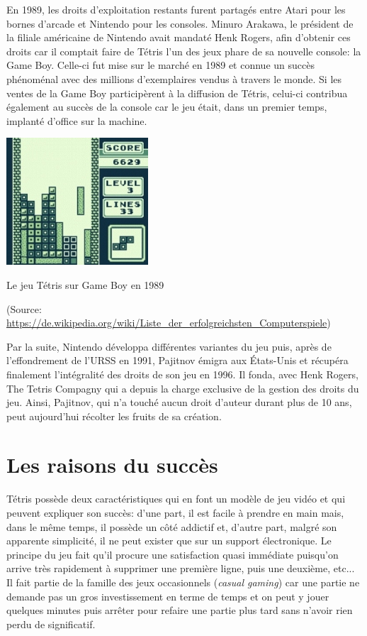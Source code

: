 En 1989, les droits d'exploitation restants furent partagés entre Atari pour les bornes d'arcade et Nintendo pour les consoles. Minuro Arakawa, le président de la filiale américaine de Nintendo avait mandaté Henk Rogers, afin d'obtenir ces droits car il comptait faire de Tétris l'un des jeux phare de sa nouvelle console: la Game Boy. Celle-ci fut mise sur le marché en 1989 et connue un succès phénoménal avec des millions d'exemplaires vendus à travers le monde. Si les ventes de la Game Boy participèrent à la diffusion de Tétris, celui-ci contribua également au succès de la console car le jeu était, dans un premier temps, implanté d'office sur la machine.

\begin{center}
	\includegraphics{media/Tetrisgb.jpg}
	
	Le jeu Tétris sur Game Boy en 1989
	
	(Source: \url{ https://de.wikipedia.org/wiki/Liste_der_erfolgreichsten_Computerspiele})
\end{center} 

Par la suite, Nintendo développa différentes variantes du jeu puis, après de l'effondrement de l'URSS en 1991, Pajitnov émigra aux \'Etats-Unis et récupéra finalement l'intégralité des droits de son jeu en 1996. Il fonda, avec Henk Rogers, The Tetris Compagny qui a depuis la charge exclusive de la gestion des droits du jeu. Ainsi, Pajitnov, qui n'a touché aucun droit d'auteur durant plus de 10 ans, peut aujourd'hui récolter les fruits de sa création.

\section{Les raisons du succès}

Tétris possède deux caractéristiques qui en font un modèle de jeu vidéo et qui peuvent expliquer son succès: d'une part, il est facile à prendre en main mais, dans le même temps, il possède un côté addictif et, d'autre part, malgré son apparente simplicité, il ne peut exister que sur un support électronique. Le principe du jeu fait qu'il procure une satisfaction quasi immédiate puisqu'on arrive très rapidement à supprimer une première ligne, puis une deuxième, etc... Il fait partie de la famille des \og jeux occasionnels \fg{} (\textit{casual gaming}) car une partie ne demande pas un gros investissement en terme de temps et on peut y jouer quelques minutes puis arrêter pour refaire une partie plus tard sans n'avoir rien perdu de significatif. 

